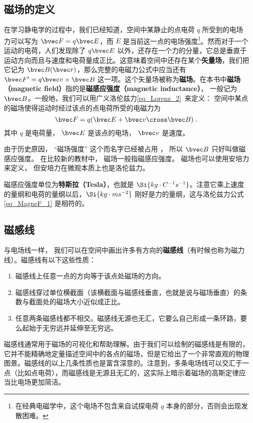 

\subsection{磁场的定义}
在学习静电学的过程中，我们已经知道，空间中某静止的点电荷 $q$ 所受到的电场力可以写为 $\bvec F=q\bvec E$，而 $E$ 是当前这一点的电场强度\footnote{在经典电磁学中，这个电场不包含来自试探电荷 $q$ 本身的部分，否则会出现发散困难。}。然而对于一个运动的电荷，人们发现除了 $q\bvec E$ 以外，还存在一个力的分量，它总是垂直于运动方向而且与速度和电荷量成正比。这意味着空间中还存在某个\textbf{矢量场}，我们把它记为 $\bvec B(\bvec r)$，那么完整的电磁力公式中应当还有 $\bvec F'=q\bvec v\times \bvec B$ 这一项。这个矢量场被称为\textbf{磁场}。在本书中\textbf{磁场（magnetic field）}指的是\textbf{磁感应强度（magnetic inductance）}， 一般记为 $\bvec B$。一般地，我们可以用广义洛伦兹力\autoref{eq_Lorenz_2}~来定义： 空间中某点的磁场使得运动时经过该点的点电荷所受的电磁力为
\begin{equation}\label{eq_MagneF_1}
\bvec F = q(\bvec E + \bvec v \cross \bvec B)~.
\end{equation}
其中 $q$ 是电荷量， $\bvec E$ 是该点的电场， $\bvec v$ 是速度。

由于历史原因， “磁场强度” 这个而名字已经被占用%
， 所以 $\bvec B$ 只好叫做磁感应强度。 在比较新的教材中， 磁场一般指磁感应强度。 磁场也可以使用安培力来定义， 但安培力在微观本质上也是洛伦兹力。 


磁感应强度单位为\textbf{特斯拉（Tesla）}，也就是 $\Si{kg\cdot C^{-1}s^{-1}}$。注意它乘上速度的量纲和电荷的量纲以后，$\Si{kg\cdot ms^{-2}}$ 刚好是力的量纲，这与洛伦兹力公式\autoref{eq_MagneF_1} 是相符的。
\subsection{磁感线}
与电场线一样， 我们可以在空间中画出许多有方向的\textbf{磁感线}（有时候也称为磁力线）。磁感线有以下这些性质：
\begin{enumerate}
\item 磁感线上任意一点的方向等于该点处磁场的方向。
\item 磁感线穿过单位横截面（该横截面与磁感线垂直，也就是说与磁场垂直）的条数与截面处的磁场大小近似成正比。
\item 任意两条磁感线都不相交。磁感线无源也无汇，它要么自己形成一条环路，要么起始于无穷远并延伸至无穷远。
\end{enumerate}
磁感线通常用于磁场的可视化和帮助理解。由于我们可以绘制的磁感线是有限的，它并不能精确地定量描述空间中的各点的磁场，但是它给出了一个非常直观的物理图景。磁感线的以上几条性质也是富含深意的。注意到，多条电场线可以交汇于一点（比如点电荷），而磁感线是无源且无汇的，这实际上暗示着磁场的高斯定律应当比电场更加简洁。


